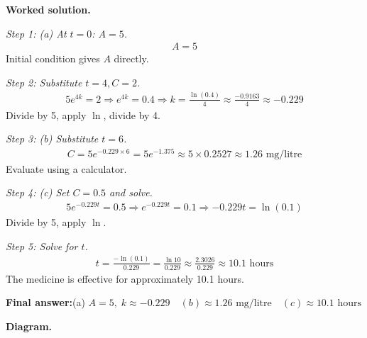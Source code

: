 \documentclass[11pt]{article}
\begin{document}
\textbf{Worked solution.}

\textit{Step 1: (a) At \( t = 0 \): \( A = 5 \).}
\[\begin{gathered}
A = 5
\end{gathered}\]
Initial condition gives \( A \) directly.

\textit{Step 2: Substitute \( t = 4, C = 2 \).}
\[\begin{gathered}
5e^{4k} = 2 \Rightarrow e^{4k} = 0.4 \Rightarrow k = \frac{\ln(0.4)}{4} \approx \frac{-0.9163}{4} \approx -0.229
\end{gathered}\]
Divide by 5, apply \( \ln \), divide by 4.

\textit{Step 3: (b) Substitute \( t = 6 \).}
\[\begin{gathered}
C = 5e^{-0.229 \times 6} = 5e^{-1.375} \approx 5 \times 0.2527 \approx 1.26 \text{ mg/litre}
\end{gathered}\]
Evaluate using a calculator.

\textit{Step 4: (c) Set \( C = 0.5 \) and solve.}
\[\begin{gathered}
5e^{-0.229t} = 0.5 \Rightarrow e^{-0.229t} = 0.1 \Rightarrow -0.229t = \ln(0.1)
\end{gathered}\]
Divide by 5, apply \( \ln \).

\textit{Step 5: Solve for \( t \).}
\[\begin{gathered}
t = \frac{-\ln(0.1)}{0.229} = \frac{\ln 10}{0.229} \approx \frac{2.3026}{0.229} \approx 10.1 \text{ hours}
\end{gathered}\]
The medicine is effective for approximately 10.1 hours.

\begin{answerbox}
\textbf{Final answer:}\quad (a) \(\displaystyle  A = 5, \; k \approx -0.229 \)\(\displaystyle  \quad  (b) \approx 1.26 \text{ mg/litre} \quad  (c) \approx 10.1 \text{ hours}\)
\end{answerbox}
\textbf{Diagram.}
\end{document}
